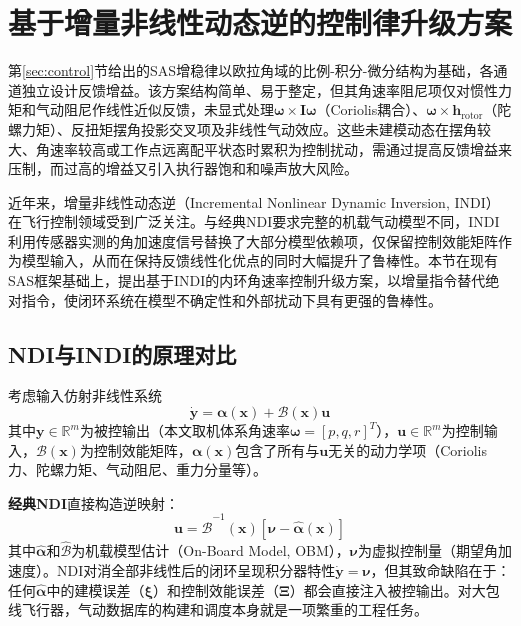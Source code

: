
\section{基于增量非线性动态逆的控制律升级方案}
\label{sec:INDI}

第\ref{sec:control}节给出的SAS增稳律以欧拉角域的比例-积分-微分结构为基础，各通道独立设计反馈增益。该方案结构简单、易于整定，但其角速率阻尼项仅对惯性力矩和气动阻尼作线性近似反馈，未显式处理$\boldsymbol{\omega}\times\mathbf{I}\boldsymbol{\omega}$（Coriolis耦合）、$\boldsymbol{\omega}\times\mathbf{h}_{\text{rotor}}$（陀螺力矩）、反扭矩摆角投影交叉项及非线性气动效应。这些未建模动态在摆角较大、角速率较高或工作点远离配平状态时累积为控制扰动，需通过提高反馈增益来压制，而过高的增益又引入执行器饱和和噪声放大风险。

近年来，增量非线性动态逆（Incremental Nonlinear Dynamic Inversion, INDI）在飞行控制领域受到广泛关注\cite{pollack2023robust,wang2019incremental}。与经典NDI要求完整的机载气动模型不同，INDI利用传感器实测的角加速度信号替换了大部分模型依赖项，仅保留控制效能矩阵作为模型输入，从而在保持反馈线性化优点的同时大幅提升了鲁棒性。本节在现有SAS框架基础上，提出基于INDI的内环角速率控制升级方案，以增量指令替代绝对指令，使闭环系统在模型不确定性和外部扰动下具有更强的鲁棒性。

\subsection{NDI与INDI的原理对比}

考虑输入仿射非线性系统
\begin{equation}
    \dot{\mathbf{y}} = \boldsymbol{\alpha}(\mathbf{x}) + \mathcal{B}(\mathbf{x})\mathbf{u}
    \label{eq:indi_system}
\end{equation}
其中$\mathbf{y}\in\mathbb{R}^m$为被控输出（本文取机体系角速率$\boldsymbol{\omega}=[p,q,r]^T$），$\mathbf{u}\in\mathbb{R}^m$为控制输入，$\mathcal{B}(\mathbf{x})$为控制效能矩阵，$\boldsymbol{\alpha}(\mathbf{x})$包含了所有与$\mathbf{u}$无关的动力学项（Coriolis力、陀螺力矩、气动阻尼、重力分量等）。

\textbf{经典NDI}直接构造逆映射\cite{stevens2015aircraft}：
\begin{equation}
    \mathbf{u} = \hat{\mathcal{B}}^{-1}(\mathbf{x})\left[\boldsymbol{\nu} - \hat{\boldsymbol{\alpha}}(\mathbf{x})\right]
    \label{eq:ndi_law}
\end{equation}
其中$\hat{\boldsymbol{\alpha}}$和$\hat{\mathcal{B}}$为机载模型估计（On-Board Model, OBM），$\boldsymbol{\nu}$为虚拟控制量（期望角加速度）。NDI对消全部非线性后的闭环呈现积分器特性$\dot{\mathbf{y}}=\boldsymbol{\nu}$，但其致命缺陷在于：任何$\hat{\boldsymbol{\alpha}}$中的建模误差（$\boldsymbol{\xi}$）和控制效能误差（$\boldsymbol{\Xi}$）都会直接注入被控输出\cite{pollack2023robust}。对大包线飞行器，气动数据库的构建和调度本身就是一项繁重的工程任务。


